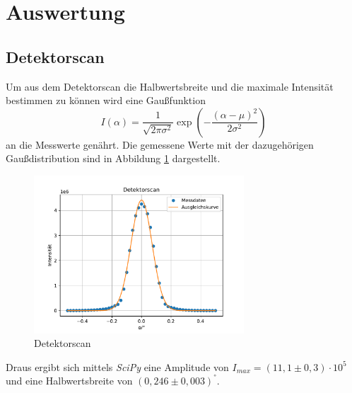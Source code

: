 \section{Auswertung}
\label{sec:Auswertung}

\subsection{Detektorscan}
 Um aus dem Detektorscan die Halbwertsbreite 
 und die maximale Intensität bestimmen zu können wird eine Gaußfunktion
 \begin{equation}
     I(\alpha) = \frac{1}{\sqrt{2\pi \sigma^2}}\exp\left(-\frac{(\alpha - \mu)^2}{2\sigma^2}\right)
 \end{equation} 
an die Messwerte genährt.
Die gemessene Werte mit der dazugehörigen Gaußdistribution sind in Abbildung \ref{fig:gauß} dargestellt.
\begin{figure}[ht]
    \centering
    \includegraphics[width = 0.7\textwidth]{Auswertung/Graphen/Detektorscan.pdf}
    \caption{Detektorscan}
    \label{fig:gauß}
\end{figure}
Draus ergibt sich mittels \textit{SciPy} \cite{scipy} eine Amplitude  von $I_{max} =(11,1\pm 0,3) \cdot 10^5$ 
und eine Halbwertsbreite von $(0,246 \pm 0,003)^°$.



